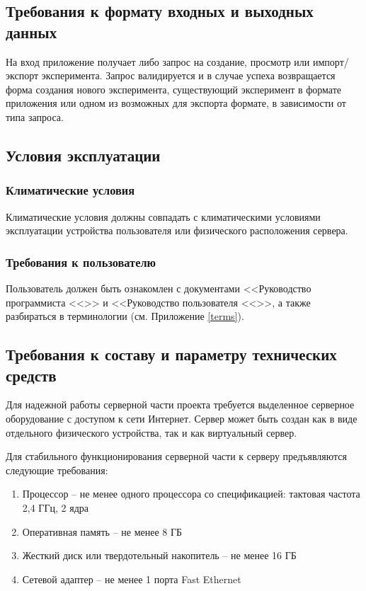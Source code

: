 \documentclass[a4paper,12pt,reqno]{article}
\begin{document}
    \subsection{Требования к формату входных и выходных данных}
    На вход приложение получает либо запрос на создание, просмотр или импорт/экспорт эксперимента. Запрос валидируется и в случае успеха возвращается форма создания нового эксперимента, существующий эксперимент в формате приложения или одном из возможных для экспорта формате, в зависимости от типа запроса.

    \subsection{Условия эксплуатации}

    \subsubsection{Климатические условия}
    Климатические условия должны совпадать с климатическими условиями эксплуатации устройства пользователя или физического расположения сервера.

    \subsubsection{Требования к пользователю}
    Пользователь должен быть ознакомлен с документами <<Руководство программиста  <<\unskip>> и <<Руководство пользователя <<\unskip>>, а также разбираться в терминологии (см. Приложение \ref{terms}).

    \subsection{Требования к составу и параметру технических средств}
    Для надежной работы серверной части проекта требуется выделенное серверное оборудование с доступом к сети Интернет. Сервер может быть создан как в виде отдельного физического устройства, так и как виртуальный сервер.

    Для стабильного функционирования серверной части к серверу предъявляются следующие требования:
    \begin{enumerate}
        \item Процессор – не менее одного процессора со спецификацией: тактовая частота 2,4 ГГц, 2 ядра
        \item Оперативная память – не менее 8 ГБ
        \item Жесткий диск или твердотельный накопитель – не менее 16 ГБ
        \item Сетевой адаптер – не менее 1 порта Fast Ethernet
    \end{enumerate}
\end{document}
